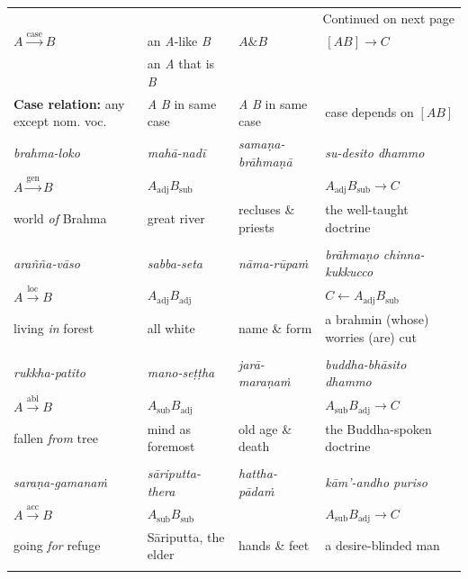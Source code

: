 \documentclass[a4paper]{memoir}
\begin{document}
\begin{minipage}{\linewidth+10pt}
\begin{longtable}{llll}
\hline
\endhead
\hline\multicolumn{4}{r}{Continued on next page} \\
\endfoot
\endlastfoot
\hline
\(A \xrightarrow{\text{case}} B\) & an \emph{A}-like \emph{B} & \(A \mathbin{\&} B\) & \([A B] \rightarrow C\)\\[0pt]
 & an \emph{A} that is \emph{B} &  & \\[0pt]
\hline
\textbf{Case relation:} any except nom. voc. & \emph{A} \emph{B} in same case & \emph{A} \emph{B} in same case & case depends on \([A B]\)\\[0pt]
\hline
\hline
\emph{brahma-loko} & \emph{mahā-nadī} & \emph{samaṇa-brāhmaṇā} & \emph{su-desito dhammo}\\[0pt]
\(A \xrightarrow{\text{gen}} B\) & \(A_{\text{adj}} B_{\text{sub}}\) &  & \(A_{\text{adj}} B_{\text{sub}} \rightarrow C\)\\[0pt]
world \emph{of} Brahma & great river & recluses \& priests & the well-taught doctrine\\[0pt]
 &  &  & \\[0pt]
\hline
\emph{arañña-vāso} & \emph{sabba-seta} & \emph{nāma-rūpaṁ} & \emph{brāhmaṇo chinna-kukkucco}\\[0pt]
\(A \xrightarrow{\text{loc}} B\) & \(A_{\text{adj}} B_{\text{adj}}\) &  & \(C \leftarrow A_{\text{adj}} B_{\text{sub}}\)\\[0pt]
living \emph{in} forest & all white & name \& form & a brahmin (whose) worries (are) cut\\[0pt]
 &  &  & \\[0pt]
\hline
\emph{rukkha-patito} & \emph{mano-seṭṭha} & \emph{jarā-maraṇaṁ} & \emph{buddha-bhāsito dhammo}\\[0pt]
\(A \xrightarrow{\text{abl}} B\) & \(A_{\text{sub}} B_{\text{adj}}\) &  & \(A_{\text{sub}} B_{\text{adj}} \rightarrow C\)\\[0pt]
fallen \emph{from} tree & mind as foremost & old age \& death & the Buddha-spoken doctrine\\[0pt]
 &  &  & \\[0pt]
\hline
\emph{saraṇa-gamanaṁ} & \emph{sāriputta-thera} & \emph{hattha-pādaṁ} & \emph{kām'-andho puriso}\\[0pt]
\(A \xrightarrow{\text{acc}} B\) & \(A_{\text{sub}} B_{\text{sub}}\) &  & \(A_{\text{sub}} B_{\text{adj}} \rightarrow C\)\\[0pt]
going \emph{for} refuge & Sāriputta, the elder & hands \& feet & a desire-blinded man\\[0pt]
 &  &  & \\[0pt]

\end{longtable}
\end{minipage}
\end{document}
